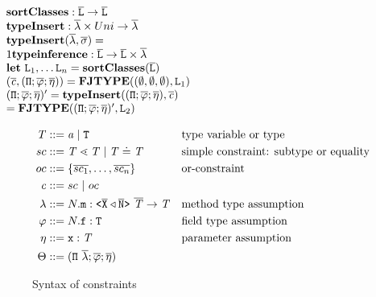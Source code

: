 \documentclass[a4paper,USenglish,cleveref, autoref, thm-restate]{lipics-v2021}
\begin{document}
$\begin{array}{l}
  \textbf{sortClasses} : \overline{\tt L} \to \overline{\tt L} \\
  \textbf{typeInsert} : \overline{\tt \mathtt{\lambda}} \times Uni \to \overline{\tt \mathtt{\lambda}}\\
  \textbf{typeInsert}(\overline{\tt \mathtt{\lambda}}, \overline{\sigma}) = \\
  1
  \textbf{typeinference} : \overline{\tt L} \to \overline{\tt L} \times \overline{\tt \mathtt{\lambda}} \\
  \textbf{let}\ \texttt{L}_1, \ldots \texttt{L}_n = \textbf{sortClasses}(\overline{\tt L}) \\
  (\mathit{\overline{c}}, ({\tt \Pi} ; \overline{\mathtt{\varphi}}; \overline{\mathtt{\eta}}) ) = \textbf{FJTYPE}{}((\emptyset, \emptyset, \emptyset), \texttt{L}_1) \\
  ({\tt \Pi} ; \overline{\mathtt{\varphi}}; \overline{\mathtt{\eta}})' = \textbf{typeInsert}(({\tt \Pi} ; \overline{\mathtt{\varphi}}; \overline{\mathtt{\eta}}), \mathit{\overline{c}})\\
   = \textbf{FJTYPE}{}(({\tt \Pi} ; \overline{\mathtt{\varphi}}; \overline{\mathtt{\eta}})', \texttt{L}_2)
  \end{array}
  $

\begin{figure}[tp]
  \begin{align*}
    \mathit{T} &::= \mathit{ a } \mid {\tt T} && \text{type variable or type}\\
    sc &::= \mathit{T} \lessdot \mathit{T} \mid \mathit{T} \doteq
        \mathit{T} && \text{simple constraint: subtype or equality}\\
    oc{} &::= \{ \overline{sc_1}, \ldots, \overline{sc_n} \} && \text{or-constraint}\\
    \mathit{c} &::= sc\ |\ oc \\
    \mathtt{\lambda} &::= N.\texttt{m} : \mathtt{ \texttt{<} \overline{\tt X}
                        \triangleleft \overline{\tt N} \texttt{>} }\ \overline{\tt \mathit{T}} \to \mathit{T}  &&
                                                                \text{method
                                                                type assumption}\\
    \mathtt{\varphi} &::= N.\texttt{f} : \texttt{T} && \text{field type assumption}\\
    \mathtt{\eta} &::= \texttt{x} : \mathit{T} && \text{parameter assumption}\\
    \Theta &::= ({\tt \Pi}\ \overline{\mathtt{\lambda}} ; \overline{\mathtt{\varphi}}; \overline{\mathtt{\eta}}) 
  \end{align*}
  \caption{Syntax of constraints}
  \label{fig:syntax-constraints}
\end{figure}
\end{document}
